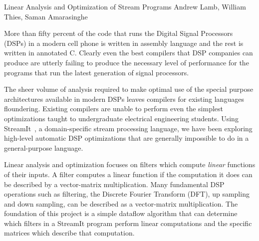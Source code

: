 

\formattitlecontents 
{Linear Analysis and Optimization of Stream Programs}
{Andrew Lamb, William Thies, Saman Amarasinghe}


%
More than fifty percent of the code that runs the Digital Signal Processors
(DSPs) in a modern cell phone is written in assembly language and the 
rest is written in annotated C\cite{gass-talk}. Clearly even the best 
compilers that DSP companies can produce are utterly failing to produce
the necessary level of performance for the programs that run the latest generation
of signal processors.

The sheer volume of analysis required to make optimal use of the special 
purpose architectures available in modern DSPs leaves compilers for existing languages 
floundering. Existing compilers are unable to perform even the simplest 
optimizations taught to undergraduate electrical engineering students. Using 
StreamIt~\cite{streamitcc}, 
a domain-specific stream processing language, we have been exploring
high-level automatic DSP optimizations that are generally impossible
to do in a general-purpose language.

Linear analysis and optimization\cite{pldi-03-linear} focuses on
filters which compute {\it linear} functions of their inputs. A filter
computes a linear function if the computation it does can be described
by a vector-matrix multiplication.  Many fundamental DSP operations
such as filtering, the Discrete Fourier Transform (DFT), up sampling
and down sampling, can be described as a vector-matrix
multiplication. The foundation of this project is a simple dataflow
algorithm that can determine which filters in a StreamIt program
perform linear computations and the specific matrices which describe
that computation.

